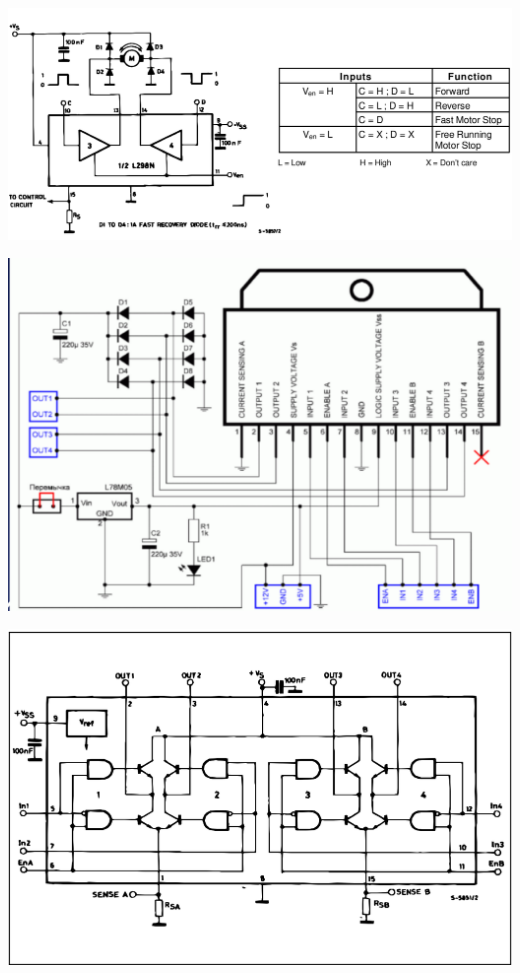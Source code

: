 \documentclass[a4paper,12pt]{article}
\begin{document}
\begin{center}
  \includegraphics[scale=0.5]{dire.pdf}
\end{center}
\begin{center}
  \includegraphics[scale=0.5]{bort.pdf}
\end{center}
\begin{center}
  \includegraphics[scale=0.5]{chip.pdf}
\end{center}
\end{document}
